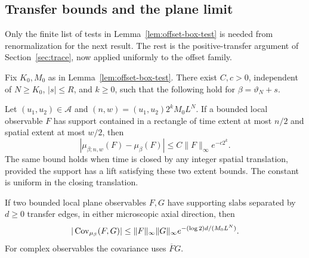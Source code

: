 \subsection{Transfer bounds and the plane limit}

Only the finite list of tests in Lemma~\ref{lem:offset-box-test}
is needed from renormalization for the next result.  The rest is the
positive-transfer argument of Section~\ref{sec:trace}, now applied
uniformly to the offset family.

\begin{proposition}
\label{prop:uniform-volume}
Fix $K_0,M_0$ as in Lemma~\ref{lem:offset-box-test}.  There exist
$C,c>0$, independent of $N\ge K_0$, $|s|\le R$, and $k\ge0$,
such that the following hold for $\beta=\vartheta_N+s$.

Let $(u_1,u_2)\in\mathcal A$ and
$(n,w)=(u_1,u_2)2^kM_0L^N$.  If a bounded local observable $F$
has support contained in a rectangle of time extent at most $n/2$
and spatial extent at most $w/2$, then
\begin{equation}
 |\mu_{\beta;n,w}(F)-\mu_\beta(F)|
       \le C\|F\|_\infty e^{-c2^k}.
 \label{eq:offset-uniform-volume}
\end{equation}
The same bound holds when time is closed by any integer spatial
translation, provided the support has a lift satisfying these two
extent bounds.  The constant is uniform in the closing translation.

If two bounded local plane observables $F,G$ have supporting slabs
separated by $d\ge0$ transfer edges, in either microscopic axial
direction, then
\begin{equation}
 |\operatorname{Cov}_{\mu_\beta}(F,G)|
 \le \|F\|_\infty\|G\|_\infty
           e^{-(\log2)d/(M_0L^N)}.
 \label{eq:offset-slab-decay}
\end{equation}
For complex observables the covariance uses $\overline F G$.
\end{proposition}

